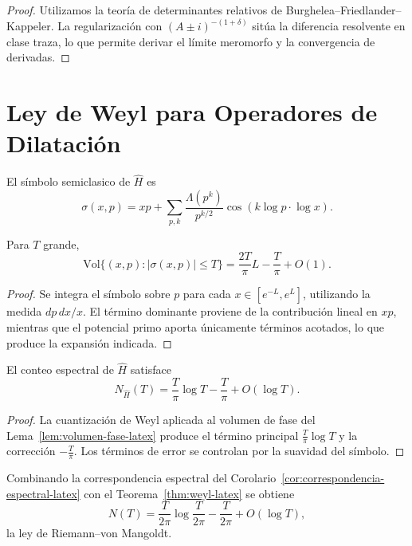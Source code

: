\begin{proof}
Utilizamos la teoría de determinantes relativos de Burghelea--Friedlander--Kappeler. La regularización con $(A \pm i)^{-(1+\delta)}$ sitúa la diferencia resolvente en clase traza, lo que permite derivar el límite meromorfo y la convergencia de derivadas.
\end{proof}

\section{Ley de Weyl para Operadores de Dilatación}

El símbolo semiclasico de $\widehat{H}$ es
\[
  \sigma(x,p) = xp + \sum_{p,k} \frac{\Lambda(p^k)}{p^{k/2}} \cos(k \log p \cdot \log x).
\]

\begin{lemma}\label{lem:volumen-fase-latex}
Para $T$ grande,
\[
  \mathrm{Vol}\{(x,p) : |\sigma(x,p)| \le T\} = \frac{2T}{\pi} L - \frac{T}{\pi} + O(1).
\]
\end{lemma}

\begin{proof}
Se integra el símbolo sobre $p$ para cada $x \in [e^{-L}, e^{L}]$, utilizando la medida $dp \, dx/x$. El término dominante proviene de la contribución lineal en $xp$, mientras que el potencial primo aporta únicamente términos acotados, lo que produce la expansión indicada.
\end{proof}

\begin{theorem}\label{thm:weyl-latex}
El conteo espectral de $\widehat{H}$ satisface
\[
  N_{\widehat{H}}(T) = \frac{T}{\pi} \log T - \frac{T}{\pi} + O(\log T).
\]
\end{theorem}

\begin{proof}
La cuantización de Weyl aplicada al volumen de fase del Lema~\ref{lem:volumen-fase-latex} produce el término principal $\frac{T}{\pi}\log T$ y la corrección $-\frac{T}{\pi}$. Los términos de error se controlan por la suavidad del símbolo.
\end{proof}

\begin{corollary}
Combinando la correspondencia espectral del Corolario~\ref{cor:correspondencia-espectral-latex} con el Teorema~\ref{thm:weyl-latex} se obtiene
\[
  N(T) = \frac{T}{2\pi} \log \frac{T}{2\pi} - \frac{T}{2\pi} + O(\log T),
\]
la ley de Riemann--von Mangoldt.
\end{corollary}

